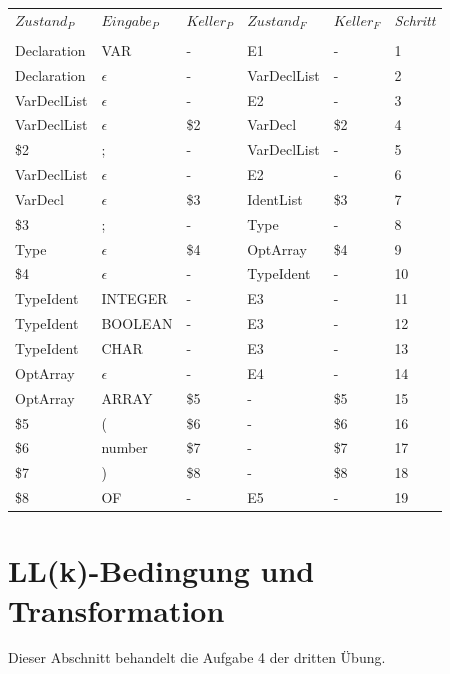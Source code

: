 \documentclass[11pt, a4paper, twoside]{article}   	%
\begin{document}
\begin{tabularx}{\textwidth}{X X X X X X}
  \emph{$Zustand_P$} & \emph{$Eingabe_P$} & \emph{$Keller_P$} & \emph{$Zustand_F$} & \emph{$Keller_F$} & \emph{Schritt} \\
  &&&& \\
  Declaration & VAR         & -    & E1          & -     & 1 \\
  Declaration & $\epsilon$  & -    & VarDeclList & -     & 2 \\
  VarDeclList & $\epsilon$  & -    & E2          & -     & 3 \\
  VarDeclList & $\epsilon$  & \$2  & VarDecl     & \$2   & 4 \\
  \$2         & ;           & -    & VarDeclList & -     & 5 \\
  VarDeclList & $\epsilon$  & -    & E2          & -     & 6 \\
  VarDecl     & $\epsilon$  & \$3  & IdentList   & \$3   & 7 \\
  \$3         & ;           & -    & Type        & -     & 8 \\
  Type        & $\epsilon$  & \$4  & OptArray    & \$4   & 9 \\
  \$4         & $\epsilon$  & -    & TypeIdent   & -     & 10 \\
  TypeIdent   & INTEGER     & -    & E3          & -     & 11 \\
  TypeIdent   & BOOLEAN     & -    & E3          & -     & 12 \\
  TypeIdent   & CHAR        & -    & E3          & -     & 13 \\
  OptArray    & $\epsilon$  & -    & E4          & -     & 14 \\
  OptArray    & ARRAY       & \$5  & -           & \$5   & 15 \\
  \$5         & (           & \$6  & -           & \$6   & 16 \\
  \$6         & number      & \$7  & -           & \$7   & 17 \\
  \$7         & )           & \$8  & -           & \$8   & 18 \\
  \$8         & OF          & -    & E5          & -     & 19 \\
 \end{tabularx}
 
\section{LL(k)-Bedingung und Transformation}
Dieser Abschnitt behandelt die Aufgabe 4 der dritten Übung.
\end{document}
